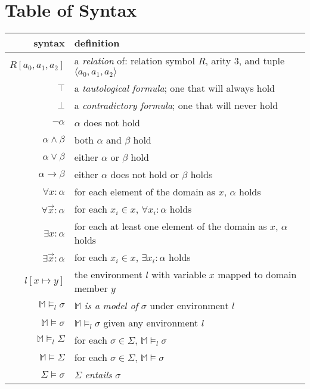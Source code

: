 \section{Table of Syntax}
	\begin{tabular}{|r|l|}
		\hline
		\textbf{syntax}                &  \textbf{definition}                                                     \\
		\hline
		$R[a_0,a_1,a_2]$               &  a \emph{relation} of: relation symbol $R$, arity $3$, and tuple $\langle a_0,a_1,a_2 \rangle$  \\
		$\top$                         &  a \emph{tautological formula}; one that will always hold                \\
		$\bot$                         &  a \emph{contradictory formula}; one that will never hold                \\
		$\neg \alpha$                  &  $\alpha$ does not hold                                                  \\
		$\alpha \wedge \beta$          &  both $\alpha$ and $\beta$ hold                                          \\
		$\alpha \vee \beta$            &  either $\alpha$ or $\beta$ hold                                         \\
		$\alpha \to \beta$             &  either $\alpha$ does not hold or $\beta$ holds                          \\
		$\forall x : \alpha$           &  for each element of the domain as $x$, $\alpha$ holds                   \\
		$\forall \vec{x} : \alpha$     &  for each $x_i \in x$, $\forall x_i : \alpha$ holds                      \\
		$\exists x : \alpha$           &  for each at least one element of the domain as $x$, $\alpha$ holds      \\
		$\exists \vec{x} : \alpha$     &  for each $x_i \in x$, $\exists x_i : \alpha$ holds                      \\
		\hline
		$l[x \mapsto y]$               &  the environment $l$ with variable $x$ mapped to domain member $y$  \\
		\hline
		$\mathbb{M} \models_l \sigma$  &  $\mathbb{M}$ \emph{is a model of} $\sigma$ under environment $l$        \\
		$\mathbb{M} \models \sigma$    &  $\mathbb{M} \models_l \sigma$ given any environment $l$                 \\
		$\mathbb{M} \models_l \Sigma$  &  for each $\sigma \in \Sigma$, $\mathbb{M} \models_l \sigma$             \\
		$\mathbb{M} \models \Sigma$    &  for each $\sigma \in \Sigma$, $\mathbb{M} \models \sigma$               \\
		\hline
		$\Sigma \models \sigma$        &  $\Sigma$ \emph{entails} $\sigma$                                        \\
		\hline
	\end{tabular}
